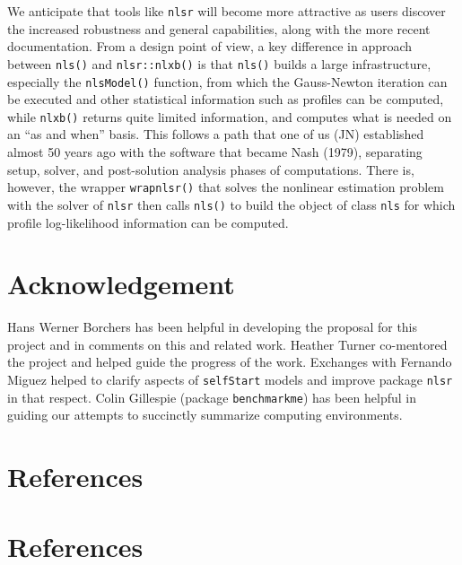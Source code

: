 We anticipate that tools like \texttt{nlsr} will become more attractive as users discover
the increased robustness and general capabilities, along with the more recent
documentation. From a design point of view, a key difference in approach between
\texttt{nls()} and \texttt{nlsr::nlxb()} is that \texttt{nls()}
builds a large infrastructure, especially the \texttt{nlsModel()} function, from
which the Gauss-Newton
iteration can be executed and other statistical information such as profiles can be
computed, while \texttt{nlxb()} returns quite limited information, and
computes what is needed on an ``as and when'' basis. This follows a path that one
of us (JN) established almost 50 years ago with the software that became Nash (1979),
separating setup, solver, and post-solution analysis phases of computations.
There is, however, the wrapper \texttt{wrapnlsr()} that solves the nonlinear estimation problem with the solver of \texttt{nlsr} then calls \texttt{nls()} to build the object of
class \texttt{nls} for which profile log-likelihood information can be computed.

\hypertarget{acknowledgement}{%
\section{Acknowledgement}\label{acknowledgement}}

Hans Werner Borchers has been helpful in developing the proposal for this project
and in comments on this and related work. Heather Turner co-mentored the project
and helped guide the progress of the work. Exchanges with Fernando Miguez helped to
clarify aspects of \texttt{selfStart} models and improve package \texttt{nlsr} in that respect.
Colin Gillespie (package \texttt{benchmarkme}) has been helpful in guiding our attempts
to succinctly summarize computing environments.

\hypertarget{references}{%
\section{References}\label{references}}

\hypertarget{references-1}{%
\section*{References}\label{references-1}}

